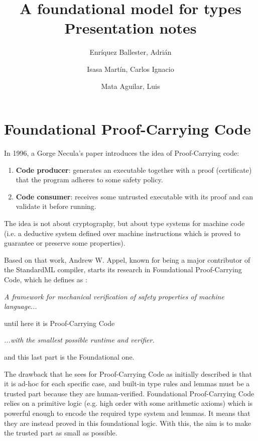 \documentclass{article}
\title{
  A foundational model for types \\
  \large Presentation notes  
}
\author{
  Enríquez Ballester, Adrián 
  \and
  Isasa Martín, Carlos Ignacio
  \and 
  Mata Aguilar, Luis
}
\begin{document}
\maketitle

\section*{Foundational Proof-Carrying Code}

In 1996, a Gorge Necula's paper \cite{necula:pcc} 
introduces the idea of Proof-Carrying code:

\begin{enumerate}
  \item \textbf{Code producer}: generates an executable 
    together with a proof (certificate) that the program 
    adheres to some safety policy.
  \item \textbf{Code consumer}: receives some untrusted 
    executable with its proof and can validate it before 
    running.
\end{enumerate}

The idea is not about cryptography, but about type systems 
for machine code (i.e. a deductive system defined over 
machine instructions which is proved to guarantee or 
preserve some properties).

Based on that work, Andrew W. Appel, known for being a 
major contributor of the StandardML compiler, starts its 
research in Foundational Proof-Carrying Code, which he 
defines as \cite{appel:fpcc}:

\begin{center}
\textit{
  A framework for mechanical verification of safety 
  properties of machine language...
}
\end{center}

until here it is Proof-Carrying Code

\begin{center}
\textit{
  ...with the smallest possible runtime and verifier.
}
\end{center}

and this last part is the Foundational one. 

The drawback that he sees for Proof-Carrying Code as 
initially described is that it is ad-hoc for each specific 
case, and built-in type rules and lemmas must be a trusted 
part because they are human-verified. Foundational 
Proof-Carrying Code relies on a primitive logic (e.g. high 
order with some arithmetic axioms) which is powerful 
enough to encode the required type system and lemmas. It 
means that they are instead proved in this foundational 
logic. With this, the aim is to make the trusted part as 
small as possible.
\end{document}

